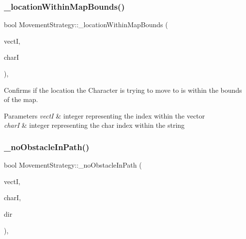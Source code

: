 \subsubsection{\texorpdfstring{\+\_\+location\+Within\+Map\+Bounds()}{\_locationWithinMapBounds()}}
{\footnotesize\ttfamily bool Movement\+Strategy\+::\+\_\+location\+Within\+Map\+Bounds (\begin{DoxyParamCaption}\item[{int}]{vectI,  }\item[{int}]{charI }\end{DoxyParamCaption})\hspace{0.3cm}{\ttfamily [protected]}, {\ttfamily [virtual]}}

Confirms if the location the Character is trying to move to is within the bounds of the map. 
\begin{DoxyParams}{Parameters}
{\em vectI} & integer representing the index within the vector \\
\hline
{\em charI} & integer representing the char index within the string \\
\hline
\end{DoxyParams}
\hypertarget{class_movement_strategy_aad894d7e60bd63c88d5d7fd1a41dc400}{}\label{class_movement_strategy_aad894d7e60bd63c88d5d7fd1a41dc400} 
\subsubsection{\texorpdfstring{\+\_\+no\+Obstacle\+In\+Path()}{\_noObstacleInPath()}}
{\footnotesize\ttfamily bool Movement\+Strategy\+::\+\_\+no\+Obstacle\+In\+Path (\begin{DoxyParamCaption}\item[{int}]{vectI,  }\item[{int}]{charI,  }\item[{\hyperlink{_movement_strategy_8h_a0b5e764f0ec9a407e9b8789f0259d754}{Movement\+Direction}}]{dir }\end{DoxyParamCaption})\hspace{0.3cm}{\ttfamily [protected]}, {\ttfamily [virtual]}}

